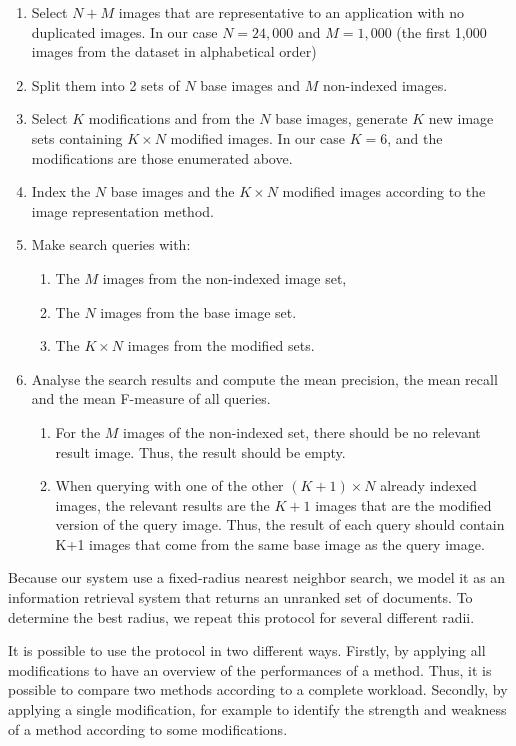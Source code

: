\begin{enumerate}
	\item Select $N+M$ images that are representative to an application with no duplicated images. In our case $N=24,000$ and $M=1,000$ (the first 1,000 images from the dataset in alphabetical order)
	\item Split them into 2 sets of $N$ base images and $M$ non-indexed images.
	\item Select $K$ modifications and from the $N$ base images, generate $K$ new image sets containing $K \times N$ modified images. In our case $K=6$, and the modifications are those enumerated above.
	\item Index the $N$ base images and the $K \times N$ modified images according to the image representation method.
	\item Make search queries with:
		\begin{enumerate}
			\item The $M$ images from the non-indexed image set,
			\item The $N$ images from the base image set.
			\item The $K \times N$ images from the modified sets.
		\end{enumerate}
	\item Analyse the search results and compute the mean precision, the mean recall and the mean F-measure of all queries.
	\begin{enumerate}
		\item For the $M$ images of the non-indexed set, there should be no relevant result image. Thus, the result should be empty.
		\item When querying with one of the other $(K+1)\times N$ already indexed images, the relevant results are the $K+1$ images that are the modified version of the query image. Thus, the result of each query should contain K+1 images that come from the same base image as the query image.
	\end{enumerate}
\end{enumerate}

Because our system use a fixed-radius nearest neighbor search, we model it as an information retrieval system that returns an unranked set of documents. To determine the best radius, we repeat this protocol for several different radii.

It is possible to use the protocol in two different ways. Firstly, by applying all modifications to have an overview of the performances of a method. Thus, it is possible to compare two methods according to a complete workload. Secondly, by applying a single modification, for example to identify the strength and weakness of a method according to some modifications.

